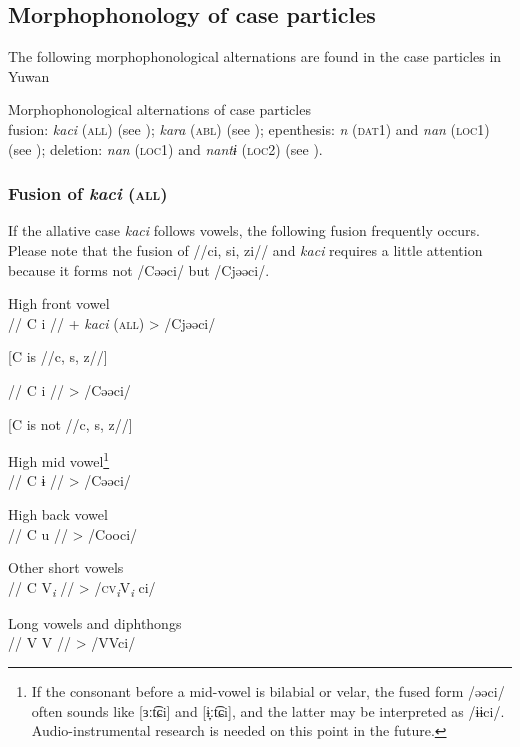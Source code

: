 \subsection{Morphophonology of case particles}

The following morphophonological alternations are found in the case particles in Yuwan

\ea\label{ex:6-30} Morphophonological alternations of case particles\\
    \ea fusion:         \textit{kaci} (\textsc{all}) (see ); \textit{kara} (\textsc{abl}) (see );
    \ex epenthesis:         \textit{n} (\textsc{dat}1) and \textit{nan} (\textsc{loc1}) (see );
    \ex deletion:         \textit{nan} (\textsc{loc1}) and \textit{nantɨ} (\textsc{loc2}) (see ).
    \z
\z

\subsubsection{Fusion of \textit{kaci} (\textsc{all})}
\label{bkm:Ref365151806}
If the allative case \textit{kaci} follows vowels, the following fusion frequently occurs. Please note that the fusion of //ci, si, zi// and \textit{kaci} requires a little attention because it forms not /Cəəci/ but /Cjəəci/.

\ea\label{ex:6-31}
 \ea High front vowel\\
    //  C  i  //  +  \textit{kaci} (\textsc{all})  >  /Cjəəci/

    [C is //c, s, z//]

    //  C  i  //      >  /Cəəci/

    [C is not //c, s, z//]

\ex High mid vowel\footnote{If the consonant before a mid-vowel is bilabial or velar, the fused form /əəci/ often sounds like [ɜːt͡ɕi] and [ɨ̞ːt͡ɕi], and the latter may be interpreted as /ɨɨci/. Audio-instrumental research is needed on this point in the future.}\\
    //  C  ɨ  //      >  /Cəəci/

\ex High back vowel\\
    //  C  u  //      >  /Cooci/

\ex Other short vowels\\
    //  C  V\textit{\textsubscript{i}}  //      >  /\textsc{cv}\textit{\textsubscript{i}}V\textit{\textsubscript{i} }ci/

\ex Long vowels and diphthongs\\
    //  V  V  //      >  /VVci/

